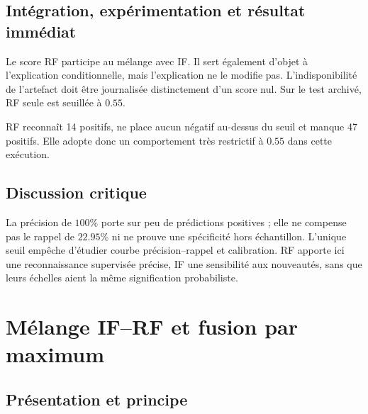 \documentclass[11pt,a4paper,oneside]{report}
\theoremstyle{definition}
\theoremstyle{plain}
\begin{document}
\subsection*{Intégration, expérimentation et résultat immédiat}

Le score RF participe au mélange avec IF. Il sert également d'objet à l'explication conditionnelle, mais l'explication ne le modifie pas. L'indisponibilité de l'artefact doit être journalisée distinctement d'un score nul. Sur le test archivé, RF seule est seuillée à $0.55$.

\begin{table}[H]
\centering
\caption{Résultat archivé de RF, $n=300$, seuil $0.55$.}
\label{tab:method-rf-results}
\small
{}
\end{table}

RF reconnaît 14 positifs, ne place aucun négatif au-dessus du seuil et manque 47 positifs. Elle adopte donc un comportement très restrictif à $0.55$ dans cette exécution.

\subsection*{Discussion critique}

La précision de $100\%$ porte sur peu de prédictions positives ; elle ne compense pas le rappel de $22.95\%$ ni ne prouve une spécificité hors échantillon. L'unique seuil empêche d'étudier courbe précision--rappel et calibration. RF apporte ici une reconnaissance supervisée précise, IF une sensibilité aux nouveautés, sans que leurs échelles aient la même signification probabiliste.

\section{Mélange IF--RF et fusion par maximum}
\label{sec:ai-ro-fusion}

\subsection*{Présentation et principe}
\end{document}
